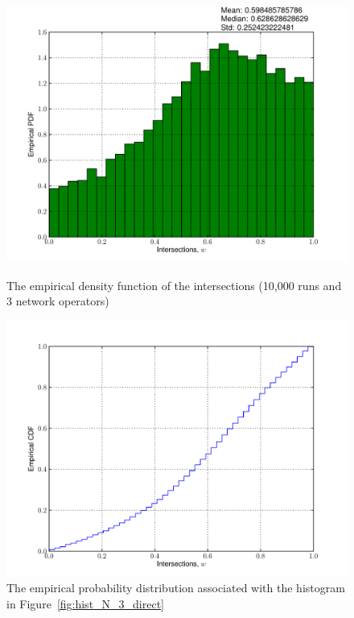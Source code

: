 \begin{figure}[p!]
	\vspace{0.5cm}
	\includegraphics[width=\figsize]{Direct/Figures/hist_N_3}
	\caption{The empirical density function of the intersections (10,000 runs and 3 network operators)}
	\label{fig:hist_N_3_direct}
	\vspace{10mm}
	\includegraphics[width=\figsize]{Direct/Figures/ecdf_N_3}
	\caption{The empirical probability distribution associated with the histogram in Figure~\ref{fig:hist_N_3_direct}}
	\label{fig:ecdf_N_3_direct}
\end{figure}

